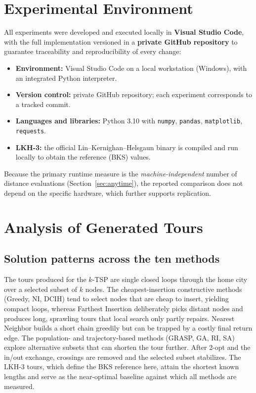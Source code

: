 \documentclass[conference]{IEEEtran}
\begin{document}
\section{Experimental Environment}
All experiments were developed and executed locally in \textbf{Visual Studio Code}, with the full implementation versioned in a \textbf{private GitHub repository} to guarantee traceability and reproducibility of every change:
\begin{itemize}
    \item \textbf{Environment:} Visual Studio Code on a local workstation (Windows), with an integrated Python interpreter.
    \item \textbf{Version control:} private GitHub repository; each experiment corresponds to a tracked commit.
    \item \textbf{Languages and libraries:} Python 3.10 with \texttt{numpy}, \texttt{pandas}, \texttt{matplotlib}, \texttt{requests}.
    \item \textbf{LKH-3:} the official Lin--Kernighan--Helsgaun binary is compiled and run locally to obtain the reference (BKS) values.
\end{itemize}
Because the primary runtime measure is the \emph{machine-independent} number of distance evaluations (Section~\ref{sec:anytime}), the reported comparison does not depend on the specific hardware, which further supports replication.

\section{Analysis of Generated Tours}
\subsection*{Solution patterns across the ten methods}

The tours produced for the $k$-TSP are single closed loops through the home city over a selected subset of $k$ nodes. The cheapest-insertion constructive methods (Greedy, NI, DCIH) tend to select nodes that are cheap to insert, yielding compact loops, whereas Farthest Insertion deliberately picks distant nodes and produces long, sprawling tours that local search only partly repairs. Nearest Neighbor builds a short chain greedily but can be trapped by a costly final return edge. The population- and trajectory-based methods (GRASP, GA, RI, SA) explore alternative subsets that can shorten the tour further. After 2-opt and the in/out exchange, crossings are removed and the selected subset stabilizes. The LKH-3 tours, which define the BKS reference here, attain the shortest known lengths and serve as the near-optimal baseline against which all methods are measured.
\end{document}
